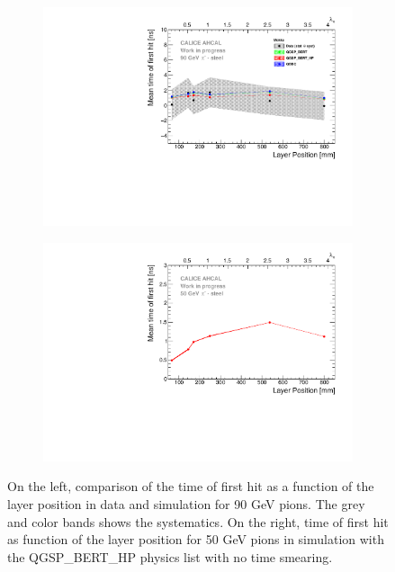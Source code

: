 \begin{figure}[htbp!]
	\begin{subfigure}[t]{0.5\textwidth}
		\centering
		\includegraphics[width=1\textwidth]{../Thesis_Plots/Timing/Pions/Plots/ComparisonToSim/Time_Depth_90GeV_Mokka.pdf}
		\caption{} \label{fig:Depth_SimData_Comparison}
	\end{subfigure}
	\hfill
	\begin{subfigure}[t]{0.5\textwidth}
		\centering
		\includegraphics[width=1\textwidth]{../Thesis_Plots/Timing/Pions/Plots/Time_Depth_50GeV_QGSP_BERT_HP_noSmearing.pdf}
		\caption{}\label{fig:Depth_Sim_noSmearing}
	\end{subfigure}
	\caption{On the left, comparison of the time of first hit as a function of the layer position in data and \mokka simulation for 90 GeV pions. The grey and color bands shows the systematics. On the right, time of first hit as function of the layer position for 50 GeV pions in simulation with the QGSP\_BERT\_HP physics list with no time smearing.}
\end{figure}

